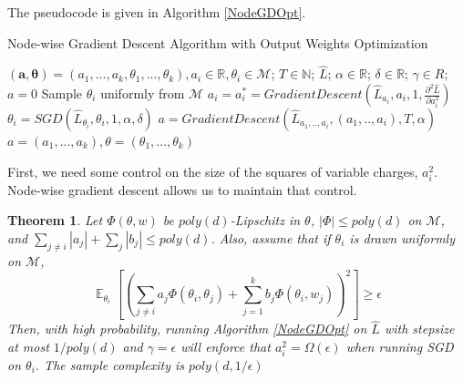 \documentclass{article}
\newtheorem{theorem}{Theorem}[section]
\newcommand{\N}{{\mathbb{N}}}
\newcommand{\R}{{\mathbb{R}}}
\DeclareMathOperator*{\expt}{\mathbb{E}}
\begin{document}
\noindent The pseudocode is given in Algorithm \ref{NodeGDOpt}. 
%
\begin{algorithm}[tb]
 \caption{Node-wise Gradient Descent Algorithm with Output Weights Optimization}
   \label{NodeGDOpt}
\begin{algorithmic}
    $(\boldsymbol{a,\theta}) = (a_1,...,a_k,\theta_1,...,\theta_k), a_i \in\R, \theta_i\in\mathcal{M}$; $T\in \N$; $\widehat{L}$; $\alpha\in \R$; $\delta \in \R$; $\gamma \in R$; 
   \vspace{0.1in}
    $a = 0$
    \REPEAT \STATE Sample $\theta_i$ uniformly from $\mathcal{M}$ 
    \STATE  $a_i =  a_i^* = GradientDescent(\widehat{L}_{a_i}, a_i, 1, \frac{\partial^2 \hat{L}}{\partial a_i^2})$
    \STATE $\theta_i =  SGD(\widehat{L}_{\theta_i}, \theta_i,1, \alpha,\delta)$
   \ENDFOR
   \STATE    $a =  GradientDescent(\widehat{L}_{a_1,..,a_i}, (a_1,..,a_i), T , \alpha)$\;
   \ENDFOR
    $a = (a_1,...,a_k), \theta = (\theta_1,..., \theta_k)$
   \end{algorithmic}
\end{algorithm}

First, we need some control on the size of the squares of variable charges, $a_i^2$. Node-wise gradient descent allows us to maintain that control.

\begin{theorem}\label{nonDecrease}
  Let $\Phi(\theta, w)$ be $poly(d)$-Lipschitz in $\theta$,
  $|\Phi| \leq poly(d)$ on $\mathcal{M}$, and $\sum_{j \neq i} |a_j| + \sum_j |b_j| \leq poly(d)$. Also, assume that if $\theta_i$ is drawn uniformly on $\mathcal{M}$,
%
\[\expt_{\theta_i}\left[\left(  \sum_{j\neq i} a_j \Phi(\theta_i,\theta_j) + \sum_{j=1}^k b_j \Phi(\theta_i,w_j)\right)^2\right] \geq \epsilon \]
%
Then, with high probability, running Algorithm \ref{NodeGDOpt} on $\widehat{L}$ with stepsize at most $1/poly(d)$ and $\gamma = \epsilon$ will enforce that $a_i^2 = \Omega(\epsilon)$ when running SGD on $\theta_i$. The sample complexity is $poly(d,1/\epsilon)$
\end{theorem}
\end{document}
